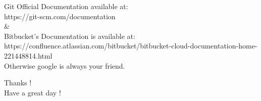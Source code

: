 \documentclass[pdf]{beamer}
\begin{document}
\begin{frame}
\begin{block}{}
Git Official Documentation available at: \\
https://git-scm.com/documentation \\
\& \\
Bitbucket's Documentation is available at: \\
https://confluence.atlassian.com/bitbucket/bitbucket-cloud-documentation-home-221448814.html \\
Otherwise google is always your friend.
\end{block}
\end{frame}

\begin{frame}
\begin{block}{}
\begin{center}
Thanks ! \\
Have a great day !
\end{center}
\end{block}
\end{frame}
\end{document}
